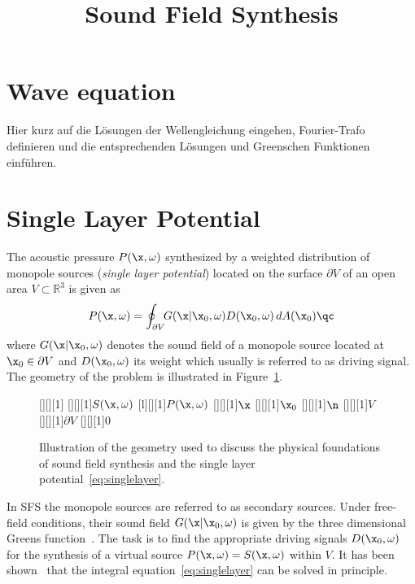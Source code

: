 \documentclass{article}
\title{Sound Field Synthesis}
\begin{document}
\maketitle

\section{Wave equation}

Hier kurz auf die Lösungen der Wellengleichung eingehen, Fourier-Trafo
definieren und die entsprechenden Lösungen und Greenschen Funktionen einführen.

\section{Single Layer Potential}
\label{sec:singlelayerpotential}

The acoustic pressure $P(\x,\omega)$ synthesized by a weighted distribution
of monopole sources (\emph{single layer potential}) located on the
surface $\partial V$ of an open area $V \subset \mathbb{R}^3$ is given as
\begin{equation}
    P(\x,\omega) = \oint_{\partial V} \!\! G(\x|\x_0,\omega) D(\x_0,\omega) \, 
    dA(\x_0) \qc
    \label{eq:singlelayer}
\end{equation}
where $G(\x|\x_0,\omega)$ denotes the sound field of a monopole
source located at $\x_0 \in \partial V$ and $D(\x_0,\omega)$ its weight which usually
is referred to as driving signal. The geometry of the problem is illustrated in
Figure~\ref{fig:KHint}.
\begin{figure}
    [][][1]{}
    [][][1]{$S(\x,\omega)$}
    [l][][1]{$P(\x,\omega)$}
    [][][1]{$\x$}
    [][][1]{$\x_0$}
    [][][1]{$\n$}
    [][][1]{$V$}
    [][][1]{$\partial V$}
    [][][1]{$0$}
    \caption{Illustration of the geometry used to discuss the physical foundations of sound field synthesis
    and the single layer potential~\eqref{eq:singlelayer}.}
    \label{fig:KHint}
\end{figure}
In SFS the monopole sources are referred to as secondary sources. Under free-field conditions,
their sound field $G(\x|\x_0,\omega)$ is given by the three dimensional Greens
function~\cite{Williams1999}. The task is to find the appropriate driving
signals $D(\x_0,\omega)$ for the synthesis of a virtual source $P(\x,\omega) = S(\x,\omega)$
within $V$. It has been shown~\cite{Fazi2009} that the integral equation~\eqref{eq:singlelayer}
can be solved in principle.
\end{document}
